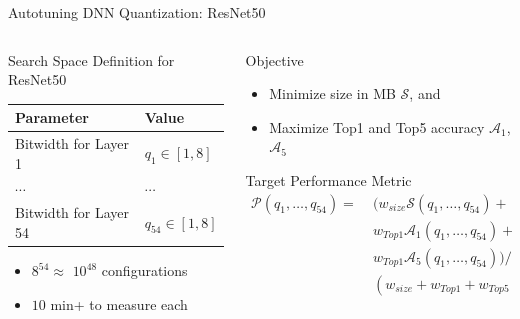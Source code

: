 \documentclass[10pt, compress, aspectratio=169, xcolor={table,usenames,dvipsnames}]{beamer}
\begin{document}
\begin{frame}[label={sec:orga364310}]{Autotuning DNN Quantization: ResNet50}
\begin{columns}
\begin{column}{0.5\columnwidth}
\begin{block}{Search Space Definition for ResNet50}
\begin{center}
\begin{tabular}{ll}
\toprule
Parameter & Value\\
\midrule
Bitwidth for Layer 1 & \(q_1 \in [1, 8]\)\\
\(\cdots{}\) & \(\cdots{}\)\\
Bitwidth for Layer 54 & \(q_{54} \in [1, 8]\)\\
\bottomrule
\end{tabular}
\end{center}

\begin{itemize}
\item \(8^{54} \approx\) \alert{\(10^{48}\)} configurations
\item \alert{\(10\) min+} to measure each
\end{itemize}
\end{block}
\end{column}
\begin{column}{0.5\columnwidth}
\begin{block}{Objective}
\begin{itemize}
\item \alert{Minimize} size in MB \(\mathcal{S}\), and
\item \alert{Maximize} Top1 and Top5 accuracy \(\mathcal{A}_{1}\), \(\mathcal{A}_{5}\)
\end{itemize}
\begin{block}{Target Performance Metric}
\begin{align*}
  \mathcal{P}(q_1, \dots, q_{54}) =
  \; & (w_{size}\mathcal{S}(q_1, \dots, q_{54}) + \\
  \; & w_{Top1}\mathcal{A}_1(q_1, \dots, q_{54}) + \\
  \; & w_{Top1}\mathcal{A}_5(q_1, \dots, q_{54})) / \\
  \; & (w_{size} + w_{Top1} + w_{Top5})
\end{align*}
\end{block}
\end{block}
\end{column}
\end{columns}
\end{frame}
\end{document}
